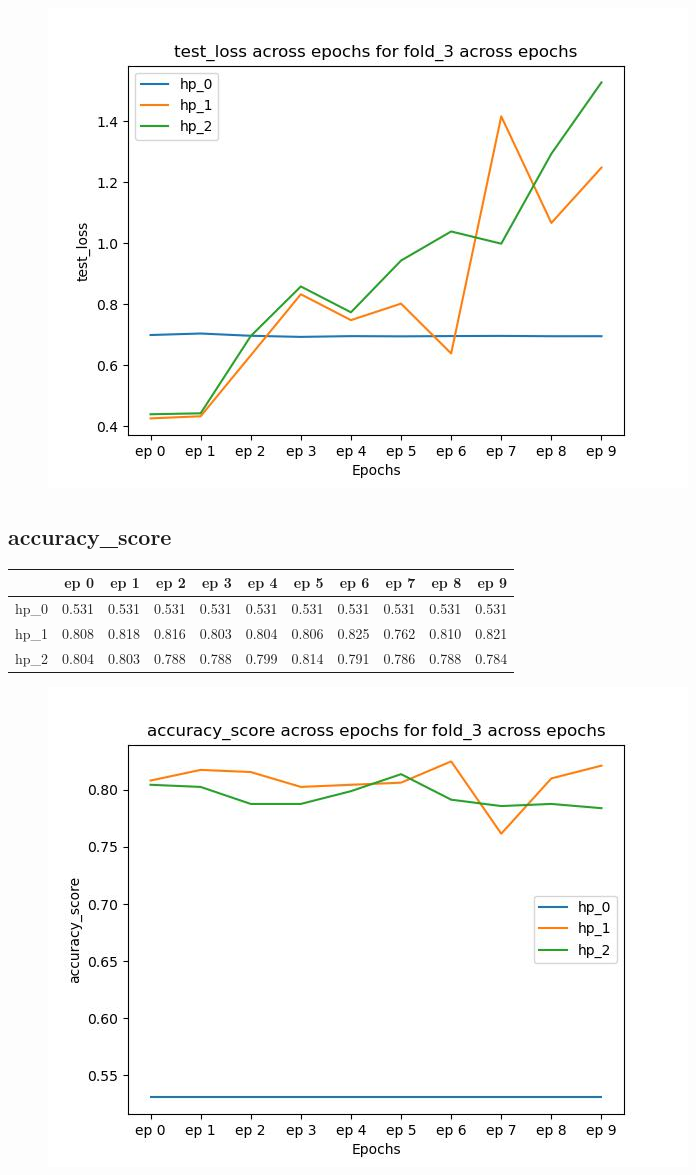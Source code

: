 \documentclass{article}
\begin{document}
\begin{figure}[H]
\includegraphics[scale = 0.75]{fold_3/test_loss}
\end{figure}
\subsection{accuracy\_score}
\begin{tabular}{lrrrrrrrrrr}
\toprule
{} &   ep 0 &   ep 1 &   ep 2 &   ep 3 &   ep 4 &   ep 5 &   ep 6 &   ep 7 &   ep 8 &   ep 9 \\
\midrule
hp\_0 &  0.531 &  0.531 &  0.531 &  0.531 &  0.531 &  0.531 &  0.531 &  0.531 &  0.531 &  0.531 \\
hp\_1 &  0.808 &  0.818 &  0.816 &  0.803 &  0.804 &  0.806 &  0.825 &  0.762 &  0.810 &  0.821 \\
hp\_2 &  0.804 &  0.803 &  0.788 &  0.788 &  0.799 &  0.814 &  0.791 &  0.786 &  0.788 &  0.784 \\
\bottomrule
\end{tabular}

\begin{figure}[H]
\includegraphics[scale = 0.75]{fold_3/accuracy_score}
\end{figure}
\end{document}
